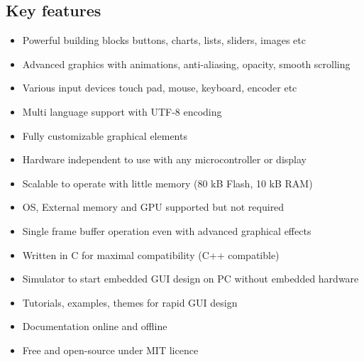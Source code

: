 \documentclass[letterpaper,10pt,english]{sphinxmanual}
\begin{document}
\subsection{Key features}
\label{\detokenize{intro:key-features}}\begin{itemize}
\item {} 
Powerful building blocks buttons, charts, lists, sliders, images etc

\item {} 
Advanced graphics with animations, anti-aliasing, opacity, smooth scrolling

\item {} 
Various input devices touch pad, mouse, keyboard, encoder etc

\item {} 
Multi language support with UTF-8 encoding

\item {} 
Fully customizable graphical elements

\item {} 
Hardware independent to use with any microcontroller or display

\item {} 
Scalable to operate with little memory (80 kB Flash, 10 kB RAM)

\item {} 
OS, External memory and GPU supported but not required

\item {} 
Single frame buffer operation even with advanced graphical effects

\item {} 
Written in C for maximal compatibility (C++ compatible)

\item {} 
Simulator to start embedded GUI design on PC without embedded hardware

\item {} 
Tutorials, examples, themes for rapid GUI design

\item {} 
Documentation online and offline

\item {} 
Free and open-source under MIT licence

\end{itemize}
\end{document}
